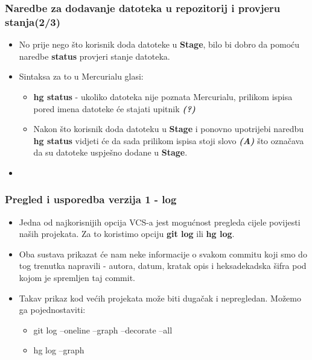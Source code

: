 \documentclass{beamer}
\begin{document}
	\begin{frame}
		\frametitle{Naredbe za dodavanje datoteka u repozitorij i provjeru stanja(2/3)}
		\begin{itemize}
			\item No prije nego što korisnik doda datoteke u \textbf{Stage}, bilo bi dobro da pomoću naredbe \textbf{status} provjeri stanje datoteka.
			\item Sintaksa za to u Mercurialu glasi:
			\begin{itemize}
				\item \textbf{hg status} - ukoliko datoteka nije poznata Mercurialu, prilikom ispisa pored imena datoteke će stajati upitnik \textbf{\textit{(?)}}
				\item Nakon što korisnik doda datoteku u \textbf{Stage} i ponovno upotrijebi naredbu \textbf{hg status} vidjeti će da sada prilikom ispisa stoji slovo \textbf{\textit{(A)}} što označava da su datoteke uspješno dodane u \textbf{Stage}.
			\end{itemize}
			\item 
		\end{itemize}
	\end{frame}


	\begin{frame}
		\frametitle{Pregled i usporedba verzija 1 - log}
		\begin{itemize}
			\item Jedna od najkorisnijih opcija VCS-a jest mogućnost pregleda cijele povijesti naših projekata. Za to koristimo opciju \textbf{git log} ili \textbf{hg log}.
			\item Oba sustava prikazat će nam neke informacije o svakom commitu koji smo do tog trenutka napravili - autora, datum, kratak opis i heksadekadska šifra pod kojom je spremljen taj commit.
			\item Takav prikaz kod većih projekata može biti dugačak i nepregledan. Možemo ga pojednostaviti:
			\begin{itemize}
				\item git log --oneline --graph --decorate --all
				\item hg log --graph
			\end{itemize}
		\end{itemize}
	\end{frame}
\end{document}
